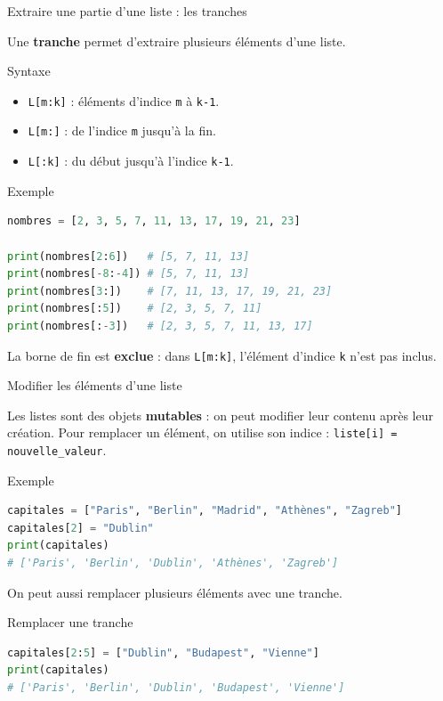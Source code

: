 \documentclass[10pt]{beamer}
\begin{document}
\begin{frame}[fragile]{Extraire une partie d'une liste : les tranches}

Une \textbf{tranche} permet d'extraire plusieurs éléments d'une liste.

\begin{block}{Syntaxe}
\begin{itemize}
    \item \texttt{L[m:k]} : éléments d'indice \texttt{m} à \texttt{k-1}.
    \item \texttt{L[m:]} : de l'indice \texttt{m} jusqu'à la fin.
    \item \texttt{L[:k]} : du début jusqu'à l'indice \texttt{k-1}.
\end{itemize}
\end{block}

\begin{exampleblock}{Exemple}
\begin{lstlisting}[language=Python]
nombres = [2, 3, 5, 7, 11, 13, 17, 19, 21, 23]

print(nombres[2:6])   # [5, 7, 11, 13]
print(nombres[-8:-4]) # [5, 7, 11, 13]
print(nombres[3:])    # [7, 11, 13, 17, 19, 21, 23]
print(nombres[:5])    # [2, 3, 5, 7, 11]
print(nombres[:-3])   # [2, 3, 5, 7, 11, 13, 17]
\end{lstlisting}
\end{exampleblock}

La borne de fin est \textbf{exclue} : dans \texttt{L[m:k]},
l'élément d'indice \texttt{k} n'est pas inclus.

\end{frame}


\begin{frame}[fragile]{Modifier les éléments d'une liste}

Les listes sont des objets \textbf{mutables} :
on peut modifier leur contenu après leur création.
Pour remplacer un élément, on utilise son indice :
\texttt{liste[i] = nouvelle\_valeur}.

\begin{exampleblock}{Exemple}
\begin{lstlisting}[language=Python]
capitales = ["Paris", "Berlin", "Madrid", "Athènes", "Zagreb"]
capitales[2] = "Dublin"
print(capitales)
# ['Paris', 'Berlin', 'Dublin', 'Athènes', 'Zagreb']
\end{lstlisting}
\end{exampleblock}

\vspace{0.2cm}

On peut aussi remplacer plusieurs éléments avec une tranche.

\begin{exampleblock}{Remplacer une tranche}
\begin{lstlisting}[language=Python]
capitales[2:5] = ["Dublin", "Budapest", "Vienne"]
print(capitales)
# ['Paris', 'Berlin', 'Dublin', 'Budapest', 'Vienne']
\end{lstlisting}
\end{exampleblock}

\end{frame}
\end{document}

